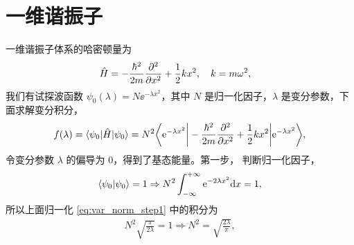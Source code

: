\section{一维谐振子}
一维谐振子体系的哈密顿量为
\begin{align}
    \hat H &= - \frac{\hbar^2}{2m} \pdv[2]x + \frac12 kx^2, \quad k=m\omega^2, 
\end{align}
我们有试探波函数 $\psi_0(\lambda) = N \ee^{-\lambda x^2}$，其中 $N$ 是归一化因子，$\lambda$ 是变分参数，下面求解变分积分，
\begin{align}
    f(\lambda) = \langle \psi_0 | \hat H | \psi_0 \rangle = N^2 \bigg\langle \mathrm{e}^{-\lambda x^2} \bigg| -\frac{\hbar^2}{2m} \pdv[2]{x} + \frac12 k x^2 \bigg| \mathrm{e}^{-\lambda x^2} \bigg\rangle,
\end{align}
令变分参数 $\lambda$ 的偏导为 0，得到了基态能量。第一步，
判断归一化因子，
\begin{align}
    \langle\psi_0 | \psi_0\rangle = 1 \Rightarrow N^2 \int_{- \infty}^{+ \infty} \mathrm{e}^{-2\lambda x^2} \mathrm{d} x = 1, \label{eq:var_norm_step1}
\end{align}
所以上面归一化 \eqref{eq:var_norm_step1} 中的积分为
\begin{align}
    N^2 \sqrt{\frac{\pi}{2\lambda}} = 1 \Rightarrow N^2 = \sqrt{\frac{2\lambda}{\pi}}, 
\end{align}

